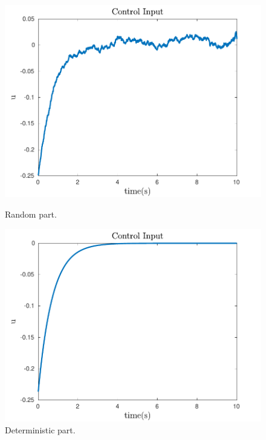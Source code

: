 \documentclass{article}
\begin{document}
\begin{figure}[H]
  \centering
  \begin{minipage}[b]{0.45\textwidth}
    \includegraphics[width=\textwidth]{fig4}
	\caption{Random part.}
  \end{minipage}
  \hfill
  \begin{minipage}[b]{0.45\textwidth}
    \includegraphics[width=\textwidth]{fig9}
	\caption{Deterministic part.}
  \end{minipage}
\end{figure}
\end{document}

